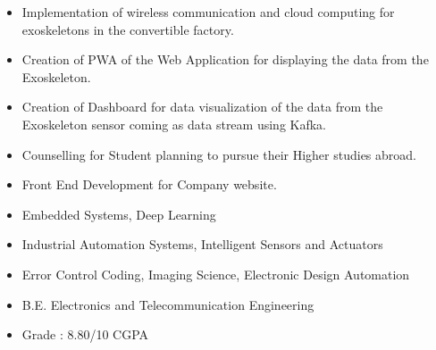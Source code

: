 \documentclass[10pt,a4paper,ragged2e]{altacv}
\begin{document}
\newpage
{}


\begin{itemize}
\item Implementation of wireless communication and cloud computing for exoskeletons in the convertible factory.
\item Creation of PWA of the Web Application for displaying the data from the Exoskeleton.
\item Creation of Dashboard for data visualization of the data from the Exoskeleton sensor coming as data stream using Kafka.


\end{itemize}

\divider


\begin{itemize}
\item Counselling for Student planning to pursue their Higher studies abroad.
\item Front End Development for Company website.

\end{itemize}
\divider



\begin{itemize}
\item Embedded Systems, Deep Learning
\item Industrial Automation Systems, Intelligent Sensors and Actuators
\item Error Control Coding, Imaging Science, Electronic Design Automation

\end{itemize}

\divider

\begin{itemize}
\item B.E. Electronics and Telecommunication Engineering

\item Grade :	8.80/10 CGPA

\end{itemize}
\end{document}
